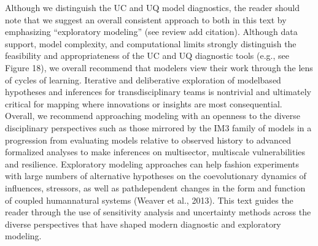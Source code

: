\documentclass[letterpaper,10pt,english]{sphinxmanual}
\begin{document}
\sphinxAtStartPar
Although we distinguish the UC and UQ model diagnostics, the reader should note that we suggest an overall consistent approach to both in this text by emphasizing “exploratory modeling” (see review add citation). Although data support, model complexity, and computational limits strongly distinguish the feasibility and appropriateness of the UC and UQ diagnostic tools (e.g., see Figure 18), we overall recommend that modelers view their work through the lens of cycles of learning. Iterative and deliberative exploration of model\sphinxhyphen{}based hypotheses and inferences for transdisciplinary teams is non\sphinxhyphen{}trivial and ultimately critical for mapping where innovations or insights are most consequential. Overall, we recommend approaching modeling with an openness to the diverse disciplinary perspectives such as those mirrored by the IM3 family of models in a progression from evaluating models relative to observed history to advanced formalized analyses to make inferences on multi\sphinxhyphen{}sector, multi\sphinxhyphen{}scale vulnerabilities and resilience. Exploratory modeling approaches can help fashion experiments with large numbers of alternative hypotheses on the co\sphinxhyphen{}evolutionary dynamics of influences, stressors, as well as path\sphinxhyphen{}dependent changes in the form and function of coupled human\sphinxhyphen{}natural systems (Weaver et al., 2013). This text guides the reader through the use of sensitivity analysis and uncertainty methods across the diverse perspectives that have shaped modern diagnostic and exploratory modeling.
\end{document}

